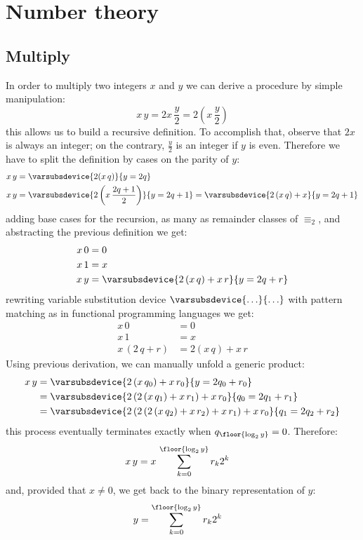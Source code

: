
\chapter{Number theory}

\section{Multiply}

In order to multiply two integers $x$ and $y$ we can derive a procedure
by simple manipulation:
\begin{displaymath}
    x\,y = 2x\,\frac{y}{2} = 2\left(x\,\frac{y}{2}\right)
\end{displaymath}
this allows us to build a recursive definition. To accomplish that, observe
that $2x$ is always an integer; on the contrary, $\frac{y}{2}$ is an integer if $y$ is even.
Therefore we have to split the definition by cases on the parity of $y$:
\begin{align}
    x\,y &= \varsubsdevice{2(x\,q)}{y=2q}\\
    x\,y &= \varsubsdevice{2\left(x\,\frac{2q+1}{2}\right)}{y=2q+1}            
            = \varsubsdevice{2\left(x\,q\right)+x}{y=2q+1}
\end{align}
adding base cases for the recursion, as many as remainder classes of $\equiv_{2}$, and 
abstracting the previous definition we get:
\begin{align}
    x\,0 &= 0\\
    x\,1 &= x\\
    x\,y &= \varsubsdevice{2\left(x\,q\right)+x\,r}{y=2q+r}
\end{align}
rewriting variable substitution device $\varsubsdevice{\ldots}{\ldots}$ with pattern matching as in functional
programming languages we get:
\begin{align}
    x\,0 &= 0\\
    x\,1 &= x\\
    x\,(2\,q+r) &= 2\left(x\,q\right)+x\,r
\end{align}
Using previous derivation, we can manually unfold a generic product:
\begin{align}
    x\,y &= \varsubsdevice{2\left(x\,q_{0}\right)+x\,r_{0}}{y=2q_{0}+r_{0}}\\
         &= \varsubsdevice{2\left(2\left(x\,q_{1}\right)+x\,r_{1}\right)+x\,r_{0}}{q_{0}=2q_{1}+r_{1}}\\
         &= \varsubsdevice{2\left(2\left(2\left(x\,q_{2}\right)+x\,r_{2}\right)+x\,r_{1}\right)+x\,r_{0}}{q_{1}=2q_{2}+r_{2}}
\end{align}
this process eventually terminates exactly when $q_{\floor{\log_{2}{y}}}=0$. Therefore:
\begin{align}
    x\,y &= x\,\sum_{k=0}^{\floor{\log_{2}{y}}}{r_{k}2^{k}}
\end{align}
and, provided that $x\neq0$, we get back to the binary representation of $y$:
\begin{align}
    y &= \sum_{k=0}^{\floor{\log_{2}{y}}}{r_{k}2^{k}}
\end{align}


